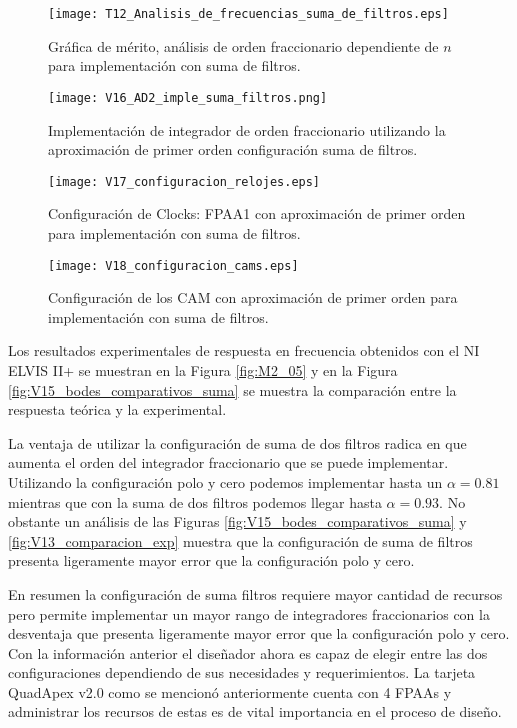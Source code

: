 	\begin{figure}[hbtp]
		\caption{Gráfica de mérito, análisis de orden fraccionario dependiente de $n$ para implementación con suma de filtros.} 
		\label{fig:T12_Analisis_de_frecuencias_suma_de_filtros}
		\centering
		\texttt{[image: T12\_Analisis\_de\_frecuencias\_suma\_de\_filtros.eps]}
	\end{figure}
	
	\begin{figure}[!ht] 
		\caption{Implementación de integrador de orden fraccionario utilizando la aproximación de primer orden configuración suma de filtros.}
		\label{fig:V16_AD2_imple_suma_filtros}
		\centering
		\texttt{[image: V16\_AD2\_imple\_suma\_filtros.png]}
	\end{figure}
	
	\begin{figure}[!ht] 
		\caption{Configuración de Clocks: FPAA1 con aproximación de primer orden para implementación con suma de filtros.}
		\label{fig:V17_configuracion_relojes}
		\centering
		\texttt{[image: V17\_configuracion\_relojes.eps]}
	\end{figure}
	
	\begin{figure}[!ht] 
		\caption{Configuración de los CAM con aproximación de primer orden para implementación con suma de filtros.}
		\label{fig:V18_configuracion_cams}
		\centering
		\texttt{[image: V18\_configuracion\_cams.eps]}
	\end{figure}
	
	Los resultados experimentales de respuesta en frecuencia obtenidos con el NI ELVIS II+ se muestran en la Figura \ref{fig:M2_05} y en la Figura \ref{fig:V15_bodes_comparativos_suma} se muestra la comparación entre la respuesta teórica y la experimental.
	
	La ventaja de utilizar la configuración de suma de dos filtros radica en que aumenta el orden del integrador fraccionario que se puede implementar. Utilizando la configuración polo y cero podemos implementar hasta un $\alpha = 0.81$  mientras que con la suma de dos filtros podemos llegar hasta $\alpha = 0.93$. No obstante un análisis de las Figuras \ref{fig:V15_bodes_comparativos_suma} y \ref{fig:V13_comparacion_exp} muestra que la configuración de suma de filtros presenta ligeramente mayor error que la configuración polo y cero. 
	
	En resumen la configuración de suma filtros requiere mayor cantidad de recursos pero permite implementar un mayor rango de integradores fraccionarios con la desventaja que presenta ligeramente mayor error que la configuración polo y cero. Con la información anterior el diseñador ahora es capaz de elegir entre las dos configuraciones dependiendo de sus necesidades y requerimientos. La tarjeta QuadApex v2.0 como se mencionó anteriormente cuenta con 4 FPAAs y administrar los recursos de estas es de vital importancia en el proceso de diseño.
	
